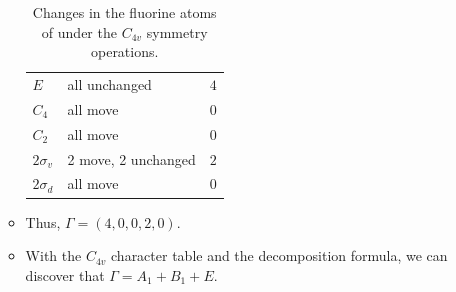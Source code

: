 \documentclass[../notes.tex]{subfiles}
\begin{document}
\begin{itemize}
\begin{itemize}
\begin{table}[H]
\begin{tabular}{lll}
                $E$ & all unchanged & $4$\\
                $C_4$ & all move & $0$\\
                $C_2$ & all move & $0$\\
                $2\sigma_v$ & 2 move, 2 unchanged & $2$\\
                $2\sigma_d$ & all move & $0$\\
            \end{tabular}
            \caption{Changes in the fluorine atoms of  under the $C_{4v}$ symmetry operations.}
            \label{tab:XeOF4-operationResults}
        \end{table}
        \item Thus, $\Gamma=(4,0,0,2,0)$.
        \item With the $C_{4v}$ character table and the decomposition formula, we can discover that $\Gamma=A_1+B_1+E$.
    \end{itemize}
\end{itemize}
\end{document}
